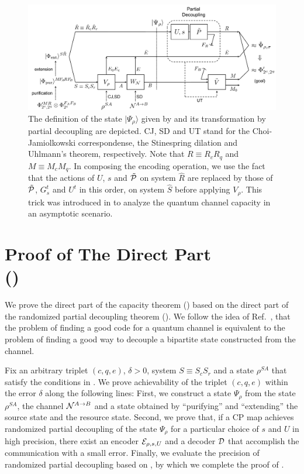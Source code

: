 \documentclass[journal]{IEEEtran}
\begin{document}
\begin{figure}[t]
\begin{center}
\includegraphics[bb={0 40 1369 582}, scale=0.3]{figure15.pdf}
\end{center}
\caption{
The definition of the state $|\Psi_\rho\rangle$ given by  and its transformation by partial decoupling are depicted.
CJ, SD and UT stand for the Choi-Jamiolkowski correspondense, the Stinespring dilation and Uhlmann's theorem, respectively.
Note that $R\equiv R_cR_q$ and $M\equiv M_cM_q$.
In composing the encoding operation, we use the fact that the actions of $U$, $s$ and $\tilde{{\mathcal P}}$ on system $\hat{R}$ are replaced by those of $\tilde{{\mathcal P}}$, $G_s^t$ and $U^t$ in this order, on system $\hat{S}$ before applying $V_\rho$. 
This trick was introduced in \cite{ADHW2009} to analyze the quantum channel capacity in an asymptotic scenario.}
\label{fig:direct}
\end{figure}



\section{Proof of The Direct Part\\()}

We prove the direct part of the capacity theorem () based on the direct part of the randomized partial decoupling theorem ().
We follow the idea of Ref.~\cite{ADHW2009}, that the problem of finding a good code for a quantum channel is equivalent to the problem of finding a good way to decouple a bipartite state constructed from the channel.


Fix an arbitrary triplet $(c,q,e)$, $\delta>0$, system $S\equiv S_cS_r$ and a state $\rho^{SA}$ that satisfy the conditions in .
We prove achievability of the triplet $(c,q,e)$ within the error $\delta$ along the following lines:
First, we construct a state $\Psi_\rho$ from the state $\rho^{SA}$, the channel ${\mathcal N}^{A\rightarrow B}$ and a state obtained by ``purifying'' and ``extending'' the source state and the resource state.
Second, we prove that, if a CP map achieves randomized partial decoupling of the state $\Psi_\rho$ for a particular choice of $s$ and $U$ in high precision, there exist an encoder ${\mathcal E}_{\rho,s,U}$ and a decoder ${\mathcal D}$ that accomplish the communication with a small error.
Finally, we evaluate the precision of randomized partial decoupling based on , by which we complete the proof of .
\end{document}
